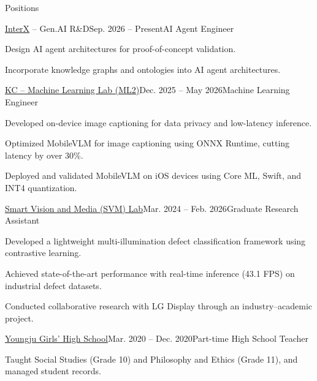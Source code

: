 \begin{rSection}{Positions}
  \begin{rSubsection}{\href{https://interxlab.com/language.php?lang=en}{InterX} -- Gen.AI R\&D}{Sep. 2026 -- Present}{AI Agent Engineer}{}
    \item Design AI agent architectures for proof-of-concept validation.
    \item Incorporate knowledge graphs and ontologies into AI agent architectures.
  \end{rSubsection}

  \begin{rSubsection}{\href{https://www.kc-ml2.com/en}{KC -- Machine Learning Lab (ML2)}}{Dec. 2025 -- May 2026}{Machine Learning Engineer}{}
    \item Developed on-device image captioning for data privacy and low-latency inference.
    \item Optimized MobileVLM for image captioning using ONNX Runtime, cutting latency by over 30\%.
    \item Deployed and validated MobileVLM on iOS devices using Core ML, Swift, and INT4 quantization.
  \end{rSubsection}

  \begin{rSubsection}{\href{https://sites.google.com/view/csi2267svm}{Smart Vision and Media (SVM) Lab}}{Mar. 2024 -- Feb. 2026}{Graduate Research Assistant}{}
    \item Developed a lightweight multi-illumination defect classification framework using contrastive learning.
    \item Achieved state-of-the-art performance with real-time inference (43.1 FPS) on industrial defect datasets.
    \item Conducted collaborative research with LG Display through an industry--academic project.
  \end{rSubsection}

  \begin{samepage}
    \begin{rSubsection}{\href{https://school.gyo6.net/yeongju-girl/main.do}{Youngju Girls' High School}}{Mar. 2020 -- Dec. 2020}{Part-time High School Teacher}{}
      \item Taught Social Studies (Grade 10) and Philosophy and Ethics (Grade 11), and managed student records.
    \end{rSubsection}
  \end{samepage}
\end{rSection}

